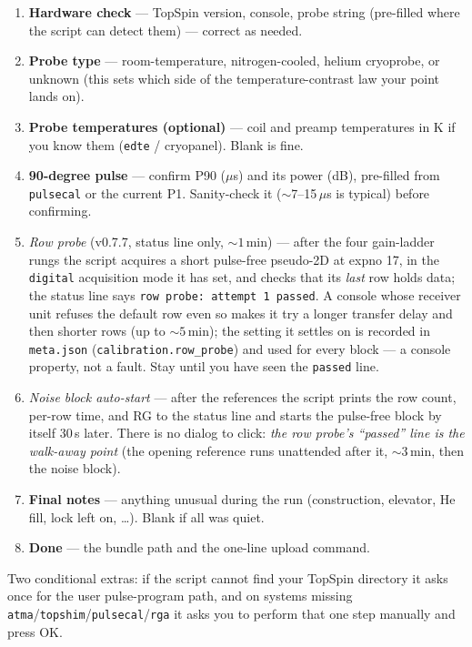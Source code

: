 \documentclass[11pt]{article}
\newcommand{\ts}{TopSpin}
\newcommand{\file}[1]{\texttt{#1}}
\newcommand{\dialog}[1]{\textbf{#1}}
\begin{document}
\begin{enumerate}
\item \dialog{Hardware check} --- \ts{} version, console, probe string
      (pre-filled where the script can detect them) --- correct as needed.
\item \dialog{Probe type} --- room-temperature, nitrogen-cooled, helium
      cryoprobe, or unknown (this sets which side of the temperature-contrast
      law your point lands on).
\item \dialog{Probe temperatures (optional)} --- coil and preamp temperatures
      in K if you know them (\texttt{edte} / cryopanel). Blank is fine.
\item \dialog{90-degree pulse} --- confirm P90 ($\mu$s) and its power (dB),
      pre-filled from \texttt{pulsecal} or the current P1. Sanity-check it
      (${\sim}$7--15\,$\mu$s is typical) before confirming.
\item \emph{Row probe} (v0.7.7, status line only, ${\sim}1$\,min) --- after
      the four gain-ladder rungs the script acquires a short pulse-free
      pseudo-2D at expno 17, in the \texttt{digital} acquisition mode it
      has set, and checks that its \emph{last} row holds data; the status
      line says \texttt{row probe: attempt 1 passed}. A console whose
      receiver unit refuses the default row even so makes it try a longer
      transfer delay and then shorter rows (up to ${\sim}5$\,min); the
      setting it settles on is recorded in \file{meta.json}
      (\texttt{calibration.row\_probe}) and used for every block --- a
      console property, not a fault. Stay until you have seen the
      \texttt{passed} line.
\item \emph{Noise block auto-start} --- after the references the script
      prints the row count, per-row time, and RG to the status line and
      starts the pulse-free block by itself 30\,s later. There is no
      dialog to click: \emph{the row probe's ``passed'' line is the
      walk-away point} (the opening reference runs unattended after it,
      ${\sim}$3\,min, then the noise block).
\item \dialog{Final notes} --- anything unusual during the run (construction,
      elevator, He fill, lock left on, \ldots). Blank if all was quiet.
\item \dialog{Done} --- the bundle path and the one-line upload command.
\end{enumerate}
Two conditional extras: if the script cannot find your \ts{} directory it
asks once for the user pulse-program path, and on systems missing
\texttt{atma}/\texttt{topshim}/\texttt{pulsecal}/\texttt{rga} it asks you to
perform that one step manually and press OK.
\end{document}
